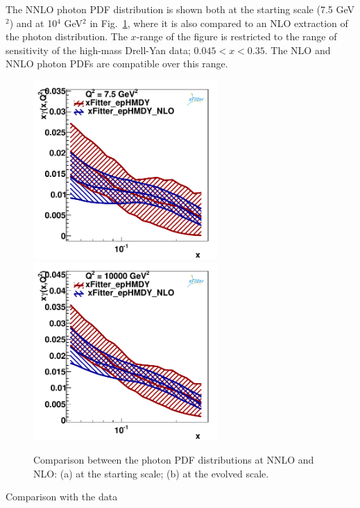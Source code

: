 The NNLO photon PDF distribution is shown 
both at the starting scale (7.5 GeV$^{2}$) and at 10$^{4}$ GeV$^{2}$ 
 in Fig.~\ref{photon}, where it is also compared to an NLO extraction of the photon distribution.
The $x$-range of the figure is restricted to the range of sensitivity of the high-mass Drell-Yan data;
$0.045 < x < 0.35$. The NLO and NNLO photon PDFs are compatible over this range.
\begin{figure}
\includegraphics[width=7cm]{plots/photon_7_5.pdf} 
\includegraphics[width=7cm]{plots/photon_10000.pdf} 
\caption{Comparison between the photon PDF distributions at NNLO and NLO: (a) at the starting scale; (b) at the evolved scale.}
\label{photon}
\end{figure}


Comparison with the data
